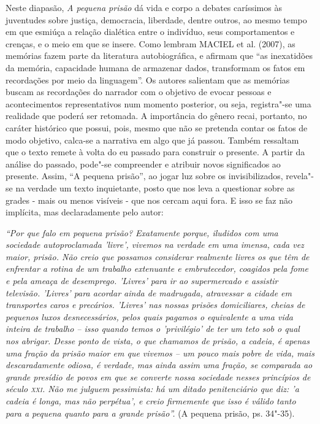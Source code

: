 \documentclass[11pt]{extarticle}
\begin{document}
Neste diapasão, \emph{A pequena prisão} dá vida e corpo a debates
caríssimos às juventudes sobre justiça, democracia, liberdade, dentre
outros, ao mesmo tempo em que esmiúça a relação dialética entre o
indivíduo, seus comportamentos e crenças, e o meio em que se insere.
Como lembram MACIEL et al. (2007), as memórias fazem parte da literatura
autobiográfica, e afirmam que ``as inexatidões da memória, capacidade
humana de armazenar dados, transformam os fatos em recordações por meio
da linguagem''. Os autores salientam que as memórias buscam as
recordações do narrador com o objetivo de evocar pessoas e
acontecimentos representativos num momento posterior, ou seja,
registra"-se uma realidade que poderá ser retomada. A importância do
gênero recai, portanto, no caráter histórico que possui, pois, mesmo que
não se pretenda contar os fatos de modo objetivo, calca-se a narrativa
em algo que já passou. Também ressaltam que o texto remete à volta do eu
passado para construir o presente. A partir da análise do passado,
pode"-se compreender e atribuir novos significados ao presente. Assim,
``A pequena prisão'', ao jogar luz sobre os invisibilizados, revela"-se
na verdade um texto inquietante, posto que nos leva a questionar sobre as
grades - mais ou menos visíveis - que nos cercam aqui fora. E isso se
faz não implícita, mas declaradamente pelo autor:

\emph{``Por que falo em pequena prisão? Exatamente porque, iludidos com
uma sociedade autoproclamada 'livre', vivemos na verdade em uma
imensa, cada vez maior, prisão. Não creio que possamos considerar
realmente livres os que têm de enfrentar a rotina de um trabalho
extenuante e embrutecedor, coagidos pela fome e pela ameaça de
desemprego. 'Livres' para ir ao supermercado e assistir televisão.
'Livres' para acordar ainda de madrugada, atravessar a cidade em
transportes caros e precários. 'Livres' nas nossas prisões
domiciliares, cheias de pequenos luxos desnecessários, pelos quais
pagamos o equivalente a uma vida inteira de trabalho -- isso quando
temos o 'privilégio' de ter um teto sob o qual nos abrigar. Desse
ponto de vista, o que chamamos de prisão, a cadeia, é apenas uma fração
da prisão maior em que vivemos -- um pouco mais pobre de vida, mais
descaradamente odiosa, é verdade, mas ainda assim uma fração, se
comparada ao grande presídio de povos em que se converte nossa sociedade
nesses princípios de século \textsc{xxi}. Não me julguem pessimista: há um ditado
penitenciário que diz: 'a cadeia é longa, mas não perpétua', e creio
firmemente que isso é válido tanto para a pequena quanto para a grande
prisão''.} (A pequena prisão, ps. 34"-35).
\end{document}
